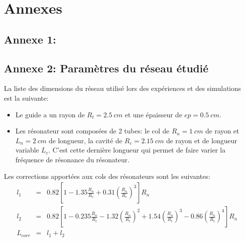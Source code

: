 \chapter*{Annexes}

\section*{Annexe 1: }


\section*{Annexe 2: Paramètres du réseau étudié }
La liste des dimensions du réseau utilisé lors des expériences et des simulations est la suivante:
\begin{itemize}
\item Le guide a un rayon de $R_t = 2.5~cm$ et une épaisseur de $ep = 0.5~cm$.
\item Les résonateur sont composées de 2 tubes: le col de $R_n = 1~cm$ de rayon et $L_n = 2~cm$ de longueur, la cavité de $R_c = 2.15~cm$ de rayon et de longueur variable $L_c$. C'est cette dernière longueur qui permet de faire varier la fréquence de résonance du résonateur. 
\end{itemize}

\bigskip
Les corrections apportées aux cols des résonateurs sont les suivantes:
\begin{eqnarray*}
l_1 & = &  0.82 \left[ 1 - 1.35 \frac{R_n}{R_c} + 0.31 \left(\frac{R_n}{R_c} \right)^3  \right] R_n \\
l_2 & = &  0.82 \left[ 1 - 0.235 \frac{R_n}{R_t} - 1.32 \left( \frac{R_n}{R_t} \right)^2 +1.54 \left( \frac{R_n}{R_t}\right)^3 - 0.86 \left( \frac{R_n}{R_t}\right)^4  \right] R_n \\
L_{corr} & = &  l_1 + l_2
\end{eqnarray*}
